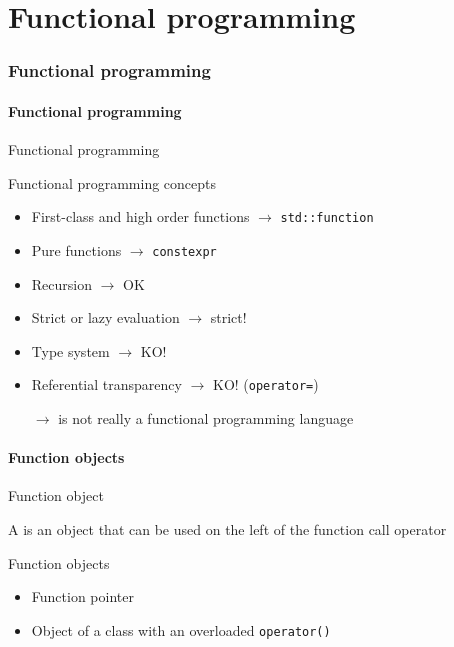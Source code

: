 \part{Functional programming}

\section{Functional programming}

\subsection{Functional programming}

\begin{frame}{Functional programming}{}
  \begin{block}{Functional programming concepts}
    \begin{itemize}
    \item
      First-class and high order functions $\to$ \lstinline!std::function!
    \item
      Pure functions $\to$ \lstinline!constexpr!
    \item
      Recursion $\to$ OK
    \item
      Strict or lazy evaluation $\to$ strict!
    \item
      Type system $\to$ KO!
    \item
      Referential transparency $\to$ KO! (\lstinline!operator=!)
    \item[$\to$]
      \CCLang is not really a functional programming language
    \end{itemize}
  \end{block}
\end{frame}


\subsection{Function objects}

\begin{frame}{Function object}{}
  \begin{definition}
    A  is an object that can be used on the left of the function call operator
  \end{definition}

  \begin{block}{Function objects}
    \begin{itemize}
    \item
      Function pointer
    \item
      Object of a class with an overloaded \lstinline!operator()!
    \end{itemize}
  \end{block}
\end{frame}


